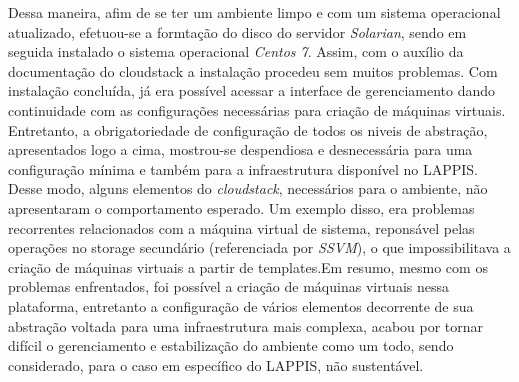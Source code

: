 Dessa maneira, afim de se ter um ambiente limpo e com um sistema operacional atualizado, efetuou-se a formtação do disco do servidor \textit{Solarian}, sendo em seguida instalado o sistema operacional \textit{Centos 7}. Assim, com o auxílio da documentação do cloudstack a instalação procedeu sem muitos problemas. Com instalação concluída, já era possível acessar a interface de gerenciamento dando continuidade com as configurações necessárias para criação de máquinas virtuais. Entretanto, a obrigatoriedade de configuração de todos os niveis de abstração, apresentados logo a cima, mostrou-se despendiosa e desnecessária para uma configuração mínima e também para a infraestrutura disponível no LAPPIS. Desse modo, alguns elementos do \textit{cloudstack}, necessários para o ambiente, não apresentaram o comportamento esperado. Um exemplo disso, era problemas recorrentes relacionados com a máquina virtual de sistema, reponsável pelas operações no storage secundário (referenciada por \textit{SSVM}), o que impossibilitava a criação de máquinas virtuais a partir de templates.Em resumo, mesmo com os problemas enfrentados, foi possível a criação de máquinas virtuais nessa plataforma, entretanto a configuração de vários elementos decorrente de sua abstração voltada para uma infraestrutura mais complexa, acabou por tornar difícil o gerenciamento e estabilização do ambiente como um todo, sendo considerado, para o caso em específico do LAPPIS, não sustentável.

